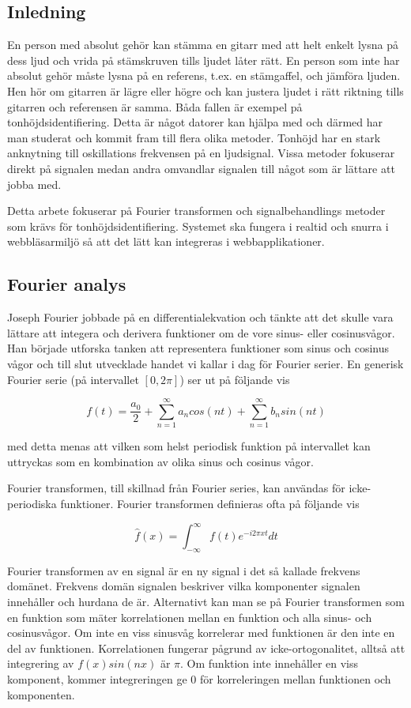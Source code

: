 \subsection*{Inledning}
En person med absolut gehör kan stämma en gitarr med att helt enkelt lysna på dess ljud och vrida på stämskruven tills ljudet låter rätt. En person som inte har absolut gehör måste lysna på en referens, t.ex. en stämgaffel, och jämföra ljuden. Hen hör om gitarren är lägre eller högre och kan justera ljudet i rätt riktning tills gitarren och referensen är samma. Båda fallen är exempel på tonhöjdsidentifiering. Detta är något datorer kan hjälpa med och därmed har man studerat och kommit fram till flera olika metoder. Tonhöjd har en stark anknytning till oskillations frekvensen på en ljudsignal. Vissa metoder fokuserar direkt på signalen medan andra omvandlar signalen till något som är lättare att jobba med.

Detta arbete fokuserar på Fourier transformen och signalbehandlings metoder som krävs för tonhöjdsidentifiering. Systemet ska fungera i realtid och snurra i webbläsarmiljö så att det lätt kan integreras i webbapplikationer.

\subsection*{Fourier analys}
Joseph Fourier jobbade på en differentialekvation och tänkte att det skulle vara lättare att integera och derivera funktioner om de vore sinus- eller cosinusvågor. Han började utforska tanken att representera funktioner som sinus och cosinus vågor och till slut utvecklade handet vi kallar i dag för Fourier serier. En generisk Fourier serie (på intervallet $[0, 2\pi]$) ser ut på följande vis

$$f(t) = \frac{a_0}{2} + \sum_{n=1}^{\infty}a_ncos(nt)+\sum_{n=1}^{\infty}b_nsin(nt)$$

med detta menas att vilken som helst periodisk funktion på intervallet kan uttryckas som en
kombination av olika sinus och cosinus vågor. 

Fourier transformen, till skillnad från Fourier series, kan användas för icke-periodiska funktioner. Fourier transformen definieras ofta på följande vis

$$\hat{f}(x) = \int_{-\infty}^{\infty} f(t)e^{-i2\pi x t} dt$$

Fourier transformen av en signal är en ny signal i det så kallade frekvens domänet. Frekvens domän signalen beskriver vilka komponenter signalen innehåller och hurdana de är. Alternativt kan man se på Fourier transformen som en funktion som mäter korrelationen mellan en funktion och alla sinus- och cosinusvågor. Om inte en viss sinusvåg korrelerar med funktionen
är den inte en del av funktionen. Korrelationen fungerar pågrund av icke-ortogonalitet, alltså att integrering av $f(x)sin(nx)$ är $\pi$. Om funktion inte innehåller en viss komponent, kommer integreringen ge $0$ för korreleringen mellan funktionen och komponenten.

